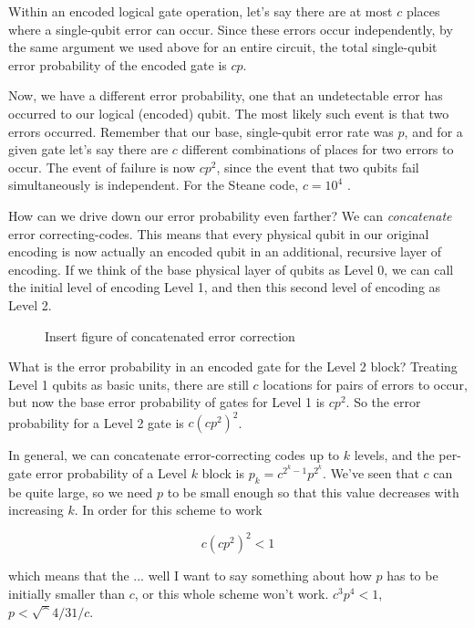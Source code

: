 Within an encoded logical gate operation, let's say there are at most $c$
places where a single-qubit error can occur. Since these errors occur
independently, by the same argument we used above for an entire circuit,
the total single-qubit error probability of the encoded gate is $cp$.

Now, we have a different error probability, one that an undetectable error
has occurred to our logical (encoded) qubit. The most likely such event is that
two errors occurred. Remember that our base, single-qubit error rate was
$p$, and for a given gate let's say there are $c$ different combinations of
places for two errors to occur. The event of failure is now $cp^2$, since the
event that two qubits fail simultaneously is independent. For the Steane
code, $c=10^4$ \cite{Nielsen2000}.

How can we drive down our error probability even farther?
We can \emph{concatenate} error correcting-codes. This means
that every physical qubit in our original encoding is now actually an
encoded qubit in an additional, recursive layer of encoding. If we think of
the base physical layer of qubits as Level 0, we can call the
initial level of encoding Level 1, and then this second level of encoding
as Level 2.

\begin{figure}
\caption{Insert figure of concatenated error correction}
\end{figure}

What is the error probability in an encoded gate for the Level 2 block?
Treating Level 1 qubits as basic units, there are still $c$ locations for
pairs of errors to occur, but now the base error probability of gates for
Level 1 is $cp^2$. So the error probability for a Level 2 gate is
$c(cp^2)^2$.

In general, we can concatenate error-correcting codes up to $k$ levels, and
the per-gate error probability of a Level $k$ block is $p_k = c^{2^k-1}p^{2^k}$.
We've seen that $c$ can be quite large, so we need $p$ to be small enough
so that this value decreases with increasing $k$. In order for this scheme
to work

\begin{displaymath}
c(cp^2)^2 < 1
\end{displaymath}

which means that the ... well I want to say something about how $p$ has
to be initially smaller than $c$, or this whole scheme won't work.
$c^3 p^4 < 1$, $p < \sqrt^{4/3}{1/c}$.

